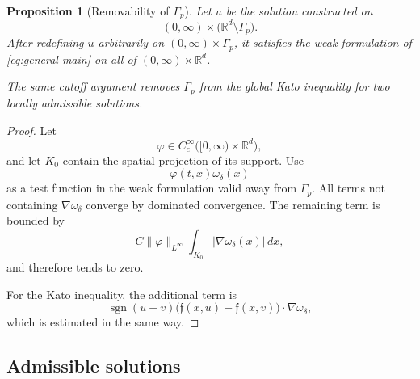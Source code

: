 \documentclass[11pt]{amsart}
\numberwithin{equation}{section}
\theoremstyle{plain}
\newtheorem{proposition}[theorem]{Proposition}
\theoremstyle{definition}
\theoremstyle{remark}
\begin{document}
\begin{proposition}[Removability of \(\Gamma_p\)]
\label{prop:general-removability}
Let \(u\) be the solution constructed on
\[
    (0,\infty)
    \times
    \bigl(\mathbb R^d\setminus\Gamma_p\bigr).
\]
After redefining \(u\) arbitrarily on
\((0,\infty)\times\Gamma_p\), it satisfies the weak formulation of
\eqref{eq:general-main} on all of
\((0,\infty)\times\mathbb R^d\).

The same cutoff argument removes \(\Gamma_p\) from the global Kato
inequality for two locally admissible solutions.
\end{proposition}

\begin{proof}
Let
\[
    \varphi
    \in
    C_c^\infty
    \bigl([0,\infty)\times\mathbb R^d\bigr),
\]
and let \(K_0\) contain the spatial projection of its support. Use
\[
    \varphi(t,x)\omega_\delta(x)
\]
as a test function in the weak formulation valid away from \(\Gamma_p\).
All terms not containing \(\nabla\omega_\delta\) converge by dominated
convergence. The remaining term is bounded by
\[
    C\|\varphi\|_{L^\infty}
    \int_{K_0}
        |\nabla\omega_\delta(x)|
    \,dx,
\]
and therefore tends to zero.

For the Kato inequality, the additional term is
\[
    \operatorname{sgn}(u-v)
    \bigl(
        \mathfrak f(x,u)-\mathfrak f(x,v)
    \bigr)
    \cdot\nabla\omega_\delta,
\]
which is estimated in the same way.
\end{proof}

\subsection{Admissible solutions}
\label{subsec:general-admissible-solutions}
\end{document}
